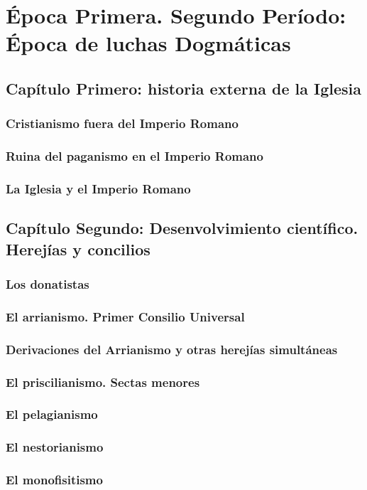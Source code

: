 \raggedbottom{} \documentclass[12pt, a4paper, openany]{book} %
\begin{document}
\part{Época Primera. Segundo Período: Época de luchas Dogmáticas}
\chapter{Capítulo Primero: historia externa de la Iglesia}
\section{Cristianismo fuera del Imperio Romano}
\section{Ruina del paganismo en el Imperio Romano}
\section{La Iglesia y el Imperio Romano}
\chapter{Capítulo Segundo: Desenvolvimiento científico. Herejías y concilios}
\section{Los donatistas}
\section{El arrianismo. Primer Consilio Universal}
\section{Derivaciones del Arrianismo y otras herejías simultáneas}
\section{El priscilianismo. Sectas menores}
\section{El pelagianismo}
\section{El nestorianismo}
\section{El monofisitismo}
\end{document}
